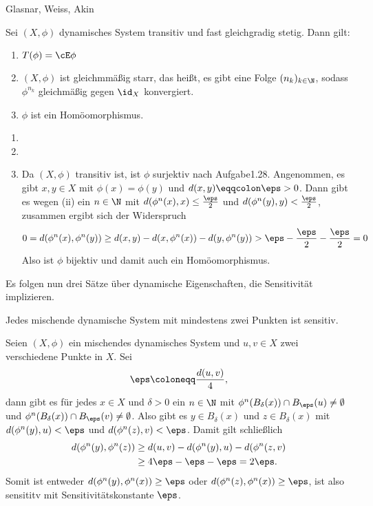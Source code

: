 \begin{satz}Glasnar, Weiss, Akin   

Sei $(X, \phi)$ dynamisches System transitiv und fast gleichgradig stetig. Dann gilt:
\begin{enumerate}
\item $T(\phi) = \cE \phi$
\item $(X, \phi)$ ist gleichmmäßig starr, das heißt, es gibt eine Folge $(n_k)_{k \in \N}$, sodass $\phi^{n_k}$ gleichmäßig gegen $\id_X$ konvergiert.
\item $\phi$ ist ein Homöomorphismus.
\end{enumerate}
\end{satz}
\begin{beweis}
\renewcommand{\labelenumi}{(\roman{enumi})}
  \begin{enumerate}
  \item 
  \item 
  \item Da $(X, \phi)$ transitiv ist, ist $\phi$ surjektiv nach Aufgabe1.28. Angenommen, es gibt $x, y \in X$ mit $\phi(x) = \phi(y)$ und $d(x, y) \eqqcolon \eps > 0$. Dann gibt es wegen (ii) ein $n \in \N$ mit $d(\phi^n(x), x) \leq \frac \eps 2$ und $d(\phi^n(y), y)< \frac \eps 2$, zusammen ergibt sich der Widerspruch 
    \begin{align*}
      0 = d(\phi^n(x), \phi^n(y)) \geq d(x, y)- d(x, \phi^n(x))- d(y, \phi^n(y))> \eps-\frac \eps 2 -\frac \eps 2 = 0
    \end{align*}
Also ist $\phi$ bijektiv und damit auch ein Homöomorphismus.
  \end{enumerate}
\end{beweis}
Es folgen nun drei Sätze über dynamische Eigenschaften, die Sensitivität implizieren. 
\begin{satz}
  Jedes mischende dynamische System mit mindestens zwei Punkten ist sensitiv.
\end{satz}
\begin{beweis}
  Seien $(X, \phi)$ ein mischendes dynamisches System und $u, v \in X$ zwei verschiedene Punkte in $X$. Sei 
  \begin{align*}
    \eps \coloneqq \frac {d(u,v)} 4,
  \end{align*}
dann gibt es für jedes $x \in X$ und $\delta > 0$ ein $n \in \N$ mit $\phi^n(B_\delta (x)) \cap B_\eps(u) \neq \emptyset$ und $\phi^n(B_\delta(x)) \cap B_\eps(v) \neq \emptyset$. Also gibt es $y \in B_\delta(x)$ und $z \in B_\delta(x)$ mit $d(\phi^n(y), u) <\eps$ und $d(\phi^n(z), v) <\eps$. Damit gilt schließlich 
\begin{align*}
  d(\phi^n(y), \phi^n(z))&\geq d(u,v) - d(\phi^n(y), u)- d(\phi^n(z, v)\\
&\geq 4 \eps - \eps - \eps = 2 \eps.
\end{align*}
Somit ist entweder $d(\phi^n(y), \phi^n(x))\geq \eps$ oder  $d(\phi^n(z), \phi^n(x))\geq \eps$, ist also sensititv mit Sensitivitätskonstante $\eps$.
\end{beweis}
